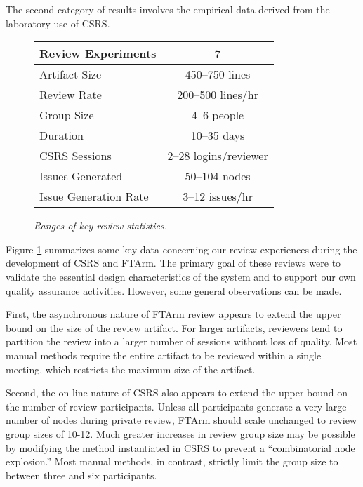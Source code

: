The second category of results involves the empirical data derived from the
laboratory use of CSRS.

\begin{figure}[h]
  \begin{center}
  \begin{tabular} {|l|c|} \hline   
    Review Experiments & 7 \\ \hline
    Artifact Size & 450--750 lines \\ \hline
    Review Rate & 200--500 lines/hr \\ \hline
    Group Size &  4--6 people\\ \hline
    Duration & 10--35 days \\ \hline
    CSRS Sessions & 2--28 logins/reviewer \\ \hline
    Issues Generated & 50--104 nodes\\ \hline
    Issue Generation Rate & 3--12 issues/hr \\ \hline 
  \end{tabular}
  \caption{{\em Ranges of key review statistics.}}
  \label{fig:statistics}
  \end{center}
\end{figure}

Figure \ref{fig:statistics} summarizes some key data concerning our review
experiences during the development of CSRS and FTArm. The primary goal of
these reviews were to validate the essential design characteristics of the
system and to support our own quality assurance activities.  However, some
general observations can be made.

First, the asynchronous nature of FTArm review appears to extend the upper
bound on the size of the review artifact. For larger artifacts, reviewers
tend to partition the review into a larger number of sessions without loss
of quality.  Most manual methods require the entire artifact to be
reviewed within a single meeting, which restricts the maximum size of the
artifact.

Second, the on-line nature of CSRS also appears to extend the upper bound
on the number of review participants.  Unless all participants generate a
very large number of nodes during private review, FTArm should scale
unchanged to review group sizes of 10-12.  Much greater increases in review
group size may be possible by modifying the method instantiated in CSRS to
prevent a ``combinatorial node explosion.''  Most manual methods, in
contrast, strictly limit the group size to between three and six
participants.

